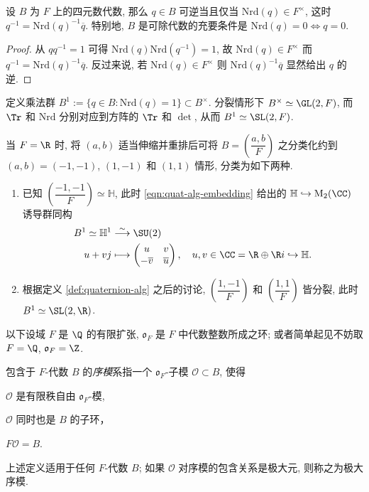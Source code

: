 \begin{proposition}
	设 $B$ 为 $F$ 上的四元数代数, 那么 $q \in B$ 可逆当且仅当 $\mathrm{Nrd}(q) \in F^\times$, 这时 $q^{-1} = \mathrm{Nrd}(q)^{-1} \overline{q}$. 特别地, $B$ 是可除代数的充要条件是 $\mathrm{Nrd}(q) = 0 \iff q = 0$.
\end{proposition}
\begin{proof}
	从 $qq^{-1} = 1$ 可得 $\mathrm{Nrd}(q) \mathrm{Nrd}(q^{-1}) = 1$, 故 $\mathrm{Nrd}(q) \in F^\times$ 而 $q^{-1} = \mathrm{Nrd}(q)^{-1} \overline{q}$. 反过来说, 若 $\mathrm{Nrd}(q) \in F^\times$ 则 $\mathrm{Nrd}(q)^{-1} \overline{q}$ 显然给出 $q$ 的逆.
\end{proof}

定义乘法群 $B^1 := \{q \in B: \text{Nrd}(q)=1 \} \subset B^\times$. 分裂情形下 $B^\times \simeq \GL(2,F)$, 而 $\Tr$ 和 $\text{Nrd}$ 分别对应到方阵的 $\Tr$ 和 $\det$, 从而 $B^1 \simeq \SL(2,F)$.

\begin{example}\label{eg:quaternion-real}
	当 $F = \R$ 时, 将 $(a,b)$ 适当伸缩并重排后可将 $B = \left( \dfrac{a,b}{F} \right)$ 之分类化约到 $(a,b) = (-1,-1)$, $(1, -1)$ 和 $(1, 1)$ 情形, 分类为如下两种.
	\begin{enumerate}
		\item 已知 $\left( \dfrac{-1, -1}{F} \right) \simeq \mathbb{H}$, 此时 \eqref{eqn:quat-alg-embedding} 给出的 $\mathbb{H} \hookrightarrow \Mat_2(\CC)$ 诱导群同构
		\begin{align*}
			B^1 \simeq \mathbb{H}^1 & \stackrel{\sim}{\longrightarrow} \SU(2) \\
			u + vj & \longmapsto \twobigmatrix{u}{v}{-\overline{v}}{\overline{u}}, \quad u,v \in \CC = \R \oplus \R i \hookrightarrow \mathbb{H}.
		\end{align*}
		\item 根据定义 \ref{def:quaternion-alg} 之后的讨论, $\left( \dfrac{1, -1}{F} \right)$ 和 $\left( \dfrac{1, 1}{F} \right)$ 皆分裂, 此时 $B^1 \simeq \SL(2,\R)$.
	\end{enumerate}
\end{example}

以下设域 $F$ 是 $\Q$ 的有限扩张, $\mathfrak{o}_F$ 是 $F$ 中代数整数所成之环; 或者简单起见不妨取 $F=\Q$, $\mathfrak{o}_F = \Z$.

\begin{definition}\label{def:order}
	包含于 $F$-代数 $B$ 的\emph{序模}系指一个 $\mathfrak{o}_F$-子模 $\mathcal{O} \subset B$, 使得
	\begin{compactitem}
		\item $\mathcal{O}$ 是有限秩自由 $\mathfrak{o}_F$-模,
		\item $\mathcal{O}$ 同时也是 $B$ 的子环，
		\item $F\mathcal{O} = B$.
	\end{compactitem}
	上述定义适用于任何 $F$-代数 $B$; 如果 $\mathcal{O}$ 对序模的包含关系是极大元, 则称之为极大序模.
\end{definition}

